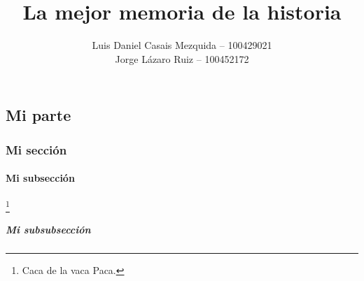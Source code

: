 \documentclass[es]{uc3mreport}
\author{
    Luis Daniel Casais Mezquida -- 100429021\\
    Jorge Lázaro Ruiz -- 100452172
}
\title{La mejor memoria de la historia}
\begin{document}
    \makecover

    \tableofcontents

    \begin{report}
        \part{Mi parte}
        \lipsum[1]

        \section{Mi sección}
        \lipsum[1]

        \subsection{Mi subsección}
        \lipsum[2-4]\footnote{Caca de la vaca Paca.}

        \subsubsection{Mi subsubsección}
        \lipsum[2-4]
    \end{report}
\end{document}

